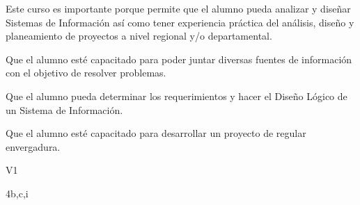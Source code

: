 \begin{syllabus}


\begin{justification}
	Este curso es importante porque permite que el alumno pueda analizar y diseñar Sistemas de Información así como tener experiencia práctica del análisis, diseño y planeamiento de proyectos a nivel regional y/o departamental.
	\end{justification}
	
	\begin{goals}
	\item Que el alumno esté capacitado para poder juntar diversas fuentes de información con el objetivo de resolver problemas.
	\item Que el alumno pueda determinar los requerimientos y hacer el Diseño Lógico de un Sistema de Información.
	\item Que el alumno esté capacitado para desarrollar un proyecto de regular envergadura.
	\end{goals}
	
	\begin{outcomes}{V1}
		\item {}
		\item {}
		\item {}
		\item {}
		\item {}
		\item {}
		\item {}
	\end{outcomes}
	
	\begin{unit}{\LUSEVENDef}{}{\LUSEVENBib}{4}{b,c,i}
	\begin{topics}
		  \item \OMCONEOHTopicTWOxONEOHxONE
		  \item \TDSSIXTopicTHREExSIXxONE
		  \item \TDSSIXTopicTHREExSIXxTWO
		  \item \TDSEIGHTTopicTHREExEIGHTxONE
	\end{topics}
		  \LUSEVENGoal
	\end{unit}
	

\end{syllabus}
